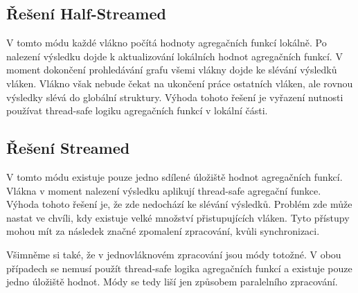 \subsection{Řešení Half-Streamed}

V tomto módu každé vlákno počítá hodnoty agregačních funkcí lokálně.
Po nalezení výsledku dojde k aktualizování lokálních hodnot agregačních funkcí.
V moment dokončení prohledávání grafu všemi vlákny dojde ke slévání výsledků vláken.
Vlákno však nebude čekat na ukončení práce ostatních vláken, ale rovnou výsledky slévá do globální struktury.
Výhoda tohoto řešení je vyřazení nutnosti používat thread-safe logiku agregačních funkcí v lokální části.

\subsection{Řešení Streamed}

V tomto módu existuje pouze jedno sdílené úložiště hodnot agregačních funkcí.
Vlákna v moment nalezení výsledku aplikují thread-safe agregační funkce.
Výhoda tohoto řešení je, že zde nedochází ke slévání výsledků.
Problém zde může nastat ve chvíli, kdy existuje velké množství přistupujících vláken.
Tyto přístupy mohou mít za následek značné zpomalení zpracování, kvůli synchronizaci.

Všimněme si také, že v jednovláknovém zpracování jsou módy totožné.
V obou případech se nemusí použít thread-safe logika agregačních funkcí a existuje pouze jedno úložiště hodnot.
Módy se tedy liší jen způsobem paralelního zpracování.